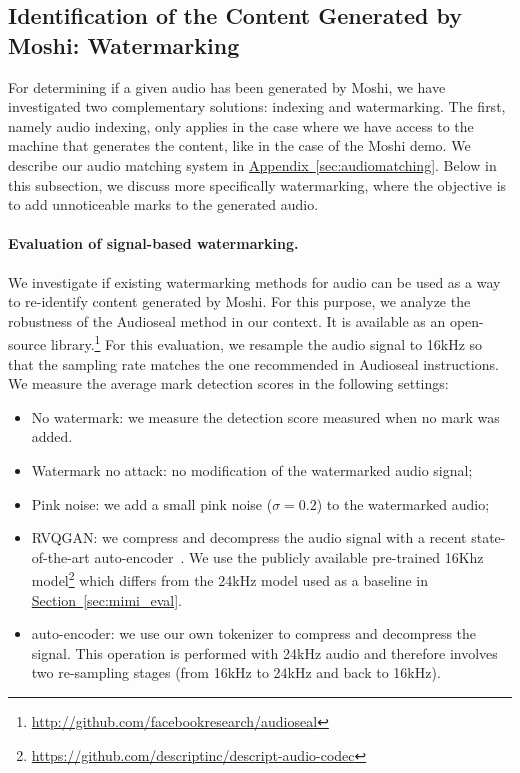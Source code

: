 \subsection{Identification of the Content Generated by Moshi: Watermarking}
\label{sec:watermarking}

For determining if a given audio has been generated by Moshi, we have investigated two complementary solutions: indexing and watermarking. The first, namely audio indexing, only applies in the case where we have access to the machine that generates the content, like in the case of the Moshi demo. We describe our audio matching system in \hyperref[sec:audiomatching]{Appendix~\ref{sec:audiomatching}}. 
Below in this subsection, we discuss more specifically watermarking, where the objective is to add unnoticeable marks to the generated audio. 

\paragraph{Evaluation of signal-based watermarking.}

We investigate if existing watermarking methods for audio can be used as a way to re-identify content generated by Moshi. For this purpose, we analyze the robustness of the Audioseal method \citep{san2024proactive} in our context. It is available as an open-source library.\footnote{\url{http://github.com/facebookresearch/audioseal}} 
For this evaluation, we resample the audio signal to 16kHz so that the sampling rate matches the one recommended in Audioseal instructions. We measure the average mark detection scores in the following settings:
\begin{itemize}
    \item No watermark: we measure the detection score measured when no mark was added. \\[-1.7em]
    \item Watermark no attack: no modification of the watermarked audio signal; \\[-1.7em]
    \item Pink noise: we add a small pink noise ($\sigma=0.2$) to the watermarked audio; \\[-1.7em]
    \item RVQGAN: we compress and decompress the audio signal with a recent state-of-the-art auto-encoder~\citep{dac}. We use the publicly available pre-trained 16Khz model\footnote{\url{https://github.com/descriptinc/descript-audio-codec}} which differs from the 24kHz model used as a baseline in \hyperref[sec:mimi_eval]{Section~\ref{sec:mimi_eval}}.\\[-1.7em]
    \item \mimi{} auto-encoder: we use our own tokenizer to compress and decompress the signal. This operation is performed with 24kHz audio and therefore involves two re-sampling stages (from 16kHz to 24kHz and back to 16kHz). 
\end{itemize}

